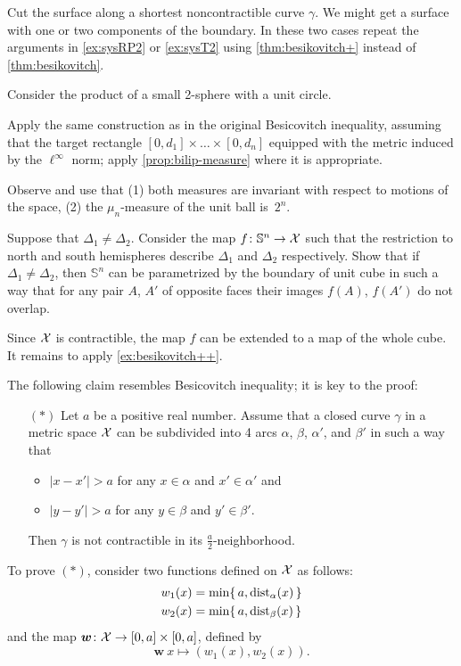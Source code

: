  Cut the surface along a shortest noncontractible curve $\gamma$. 
We might get a surface with one or two components of the boundary.
In these two cases repeat the arguments in \ref{ex:sysRP2} or \ref{ex:sysT2} using \ref{thm:besikovitch+} instead of \ref{thm:besikovitch}.


 Consider the product of a small 2-sphere with a unit circle.

Apply the same construction as in the original Besicovitch inequality, assuming that the target rectangle
$[0,d_1]\times\dots\times [0,d_n]$ equipped with the metric induced by the $\ell^\infty$ norm;
apply \ref{prop:bilip-measure} where it is appropriate.

 Observe and use that 
(1) both measures are invariant with respect to motions of the space,
(2) the $\mu_n$-measure of the unit ball is~$2^n$. 

 Suppose that $\Delta_1\ne\Delta_2$.
Consider the map $f\colon\mathbb{S}^n\to \mathcal{X}$ such that the restriction to north and south hemispheres describe $\Delta_1$ and $\Delta_2$ respectively.
Show that if $\Delta_1\ne\Delta_2$, then $\mathbb{S}^n$ can be parametrized by the boundary of unit cube in such a way that for any pair $A$, $A'$ of opposite faces their images $f(A)$, $f(A')$ do not overlap.

Since $\mathcal{X}$ is contractible, the map $f$ can be extended to a map of the whole cube.
It remains to apply \ref{ex:besikovitch++}.


The following claim resembles Besicovitch inequality;
it is key to the proof:
\begin{itemize}
 \item[$({*})$] Let $a$ be a positive real number.
 Assume that a closed curve $\gamma$ in a metric space $\mathcal{X}$ can be subdivided into 4 arcs $\alpha$, $\beta$, $\alpha'$, and $\beta'$ in such a way that 
 \begin{itemize}
 \item $|x-x'|>a$ for any $x\in\alpha$ and $x'\in \alpha'$
 and
 \item $|y-y'|>a$ for any $y\in\beta$ and $y'\in \beta'$.
 \end{itemize}
 Then $\gamma$ is not contractible in its $\tfrac a2$-neighborhood.
\end{itemize}

To prove $({*})$, consider two functions defined on $\mathcal{X}$ as follows:
\begin{align*}
w_1(x)&=\min \{\,a,\mathrm{dist}_{\alpha}(x)\,\}
\\
w_2(x)&=\min \{\,a,\mathrm{dist}_{\beta}(x)\,\}
\end{align*}
and the map $\bm{w}\colon\mathcal{X}\to [0,a]\times[0,a]$, defined by
\[\bm{w}\:x\mapsto(w_1(x),w_2(x)).\]

